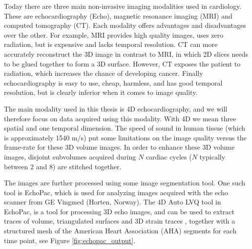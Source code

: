 Today there are three main non-invasive imaging modalities used in
cardiology. These are echocardiography (Echo), magnetic
resonance imaging (MRI) and computed tomography (CT). Each
modality offers advantages and disadvantages over the other.
For example, MRI provides
high quality images, uses zero radiation, but is expensive and lacks
temporal resolution. CT can more accurately reconstruct the 3D image
in contrast to MRI, in which 2D slices needs to be glued together to
form a 3D surface. However, CT exposes the patient to radiation, which
increases the chance of developing cancer. Finally echocardiography is
easy to use, cheap, harmless, and  has good temporal resolution, but
is clearly inferior when it comes to image quality. 


The main modality used in this thesis is 4D echocardiography, and we
will therefore focus on data acquired using this modality.
With 4D we mean three spatial and one temporal dimension.
The speed of sound in human tissue (which is approximately 1540 m/s)
put some limitations on the image quality versus the frame-rate
\cite{rabben2010technical} for these 3D volume images. In order to
enhance these 3D volume images, disjoint subvolumes acquired during
$N$ cardiac cycles ($N$ typically between 2 and
8)\cite{brekke2007volume} are stitched together.  

The images are further processed using some image segmentation tool.
One such tool is EchoPac, which is used for analyzing images acquired with
the echo scanner from GE Vingmed (Horten, Norway). The 4D Auto LVQ tool in EchoPac, is
a tool for processing 3D echo images, and can be used to extract traces of volume,
triangulated surfaces and 3D strain traces \cite{heimdal20114d},
together with a structured mesh of the American Heart Association (AHA) segments
\cite{cerqueira2002standardized} for each time point, see Figure
\ref{fig:echopac_output}. 

